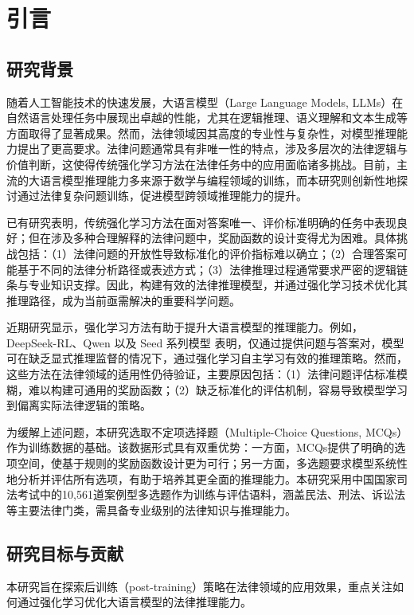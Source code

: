\documentclass{pkuthesis}
\begin{document}
\section{引言}

\subsection{研究背景}

随着人工智能技术的快速发展，大语言模型（Large Language Models, LLMs）在自然语言处理任务中展现出卓越的性能，尤其在逻辑推理、语义理解和文本生成等方面取得了显著成果。然而，法律领域因其高度的专业性与复杂性，对模型推理能力提出了更高要求。法律问题通常具有非唯一性的特点，涉及多层次的法律逻辑与价值判断，这使得传统强化学习方法在法律任务中的应用面临诸多挑战。目前，主流的大语言模型推理能力多来源于数学与编程领域的训练，而本研究则创新性地探讨通过法律复杂问题训练，促进模型跨领域推理能力的提升。

已有研究表明，传统强化学习方法在面对答案唯一、评价标准明确的任务中表现良好；但在涉及多种合理解释的法律问题中，奖励函数的设计变得尤为困难。具体挑战包括：（1）法律问题的开放性导致标准化的评价指标难以确立；（2）合理答案可能基于不同的法律分析路径或表述方式；（3）法律推理过程通常要求严密的逻辑链条与专业知识支撑。因此，构建有效的法律推理模型，并通过强化学习技术优化其推理路径，成为当前亟需解决的重要科学问题。

近期研究显示，强化学习方法有助于提升大语言模型的推理能力。例如，DeepSeek-RL\cite{guo2025deepseek}、Qwen\cite{yang2024qwen2} 以及 Seed 系列模型\cite{seed2025seed} 表明，仅通过提供问题与答案对，模型可在缺乏显式推理监督的情况下，通过强化学习自主学习有效的推理策略。然而，这些方法在法律领域的适用性仍待验证，主要原因包括：（1）法律问题评估标准模糊，难以构建可通用的奖励函数；（2）缺乏标准化的评估机制，容易导致模型学习到偏离实际法律逻辑的策略。

为缓解上述问题，本研究选取不定项选择题（Multiple-Choice Questions, MCQs）作为训练数据的基础。该数据形式具有双重优势：一方面，MCQs提供了明确的选项空间，使基于规则的奖励函数设计更为可行；另一方面，多选题要求模型系统性地分析并评估所有选项，有助于培养其更全面的推理能力。本研究采用中国国家司法考试中的10,561道案例型多选题作为训练与评估语料，涵盖民法、刑法、诉讼法等主要法律门类，需具备专业级别的法律知识与推理能力。

\subsection{研究目标与贡献}

本研究旨在探索后训练（post-training）策略在法律领域的应用效果，重点关注如何通过强化学习优化大语言模型的法律推理能力。
\end{document}
